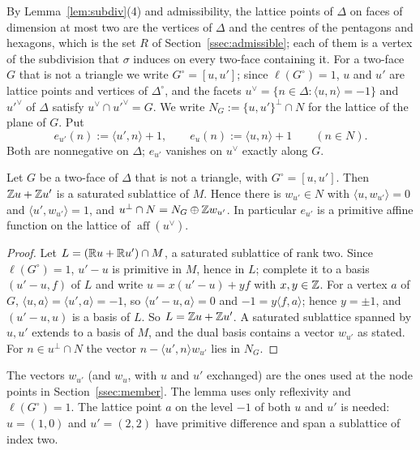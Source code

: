 By Lemma~\ref{lem:subdiv}(4) and admissibility, the lattice points of $\Delta$ on faces of dimension at most two are the
vertices of $\Delta$ and the centres of the pentagons and hexagons, which is the set $R$ of
Section~\ref{ssec:admissible}; each of them is a vertex of the subdivision that $\sigma$ induces on every two-face
containing it. For a two-face $G$ that is not a triangle we write $G^\circ=[u,u']$; since $\ell(G^\circ)=1$, $u$ and $u'$
are lattice points and vertices of $\Delta^\circ$, and the facets $u^\vee=\{n\in\Delta:\langle u,n\rangle=-1\}$ and
$u'^\vee$ of $\Delta$ satisfy $u^\vee\cap u'^\vee=G$. We write $N_G:=\{u,u'\}^\perp\cap N$ for the lattice of the plane of $G$. Put
\[
e_{u'}(n):=\langle u',n\rangle+1,\qquad e_u(n):=\langle u,n\rangle+1\qquad(n\in N).
\]
Both are nonnegative on $\Delta$; $e_{u'}$ vanishes on $u^\vee$ exactly along $G$.

\begin{lemma}\label{lem:primheight}
Let $G$ be a two-face of $\Delta$ that is not a triangle, with $G^\circ=[u,u']$. Then $\mathbb Z u+\mathbb Z u'$ is a saturated
sublattice of $M$. Hence there is $w_{u'}\in N$ with $\langle u,w_{u'}\rangle=0$ and $\langle u',w_{u'}\rangle=1$, and
$u^\perp\cap N=N_G\oplus\mathbb Z w_{u'}$. In particular $e_{u'}$ is a primitive
affine function on the lattice of $\operatorname{aff}(u^\vee)$.
\end{lemma}

\begin{proof}
Let $L=(\mathbb R u+\mathbb R u')\cap M$, a saturated sublattice of rank two. Since $\ell(G^\circ)=1$, $u'-u$ is primitive in $M$, hence
in $L$; complete it to a basis $(u'-u,f)$ of $L$ and write $u=x(u'-u)+yf$ with $x,y\in\mathbb Z$. For a vertex $a$ of $G$,
$\langle u,a\rangle=\langle u',a\rangle=-1$, so $\langle u'-u,a\rangle=0$ and $-1=y\langle f,a\rangle$; hence $y=\pm1$, and
$(u'-u,u)$ is a basis of $L$. So $L=\mathbb Z u+\mathbb Z u'$. A saturated sublattice spanned by $u,u'$ extends to a basis of $M$, and the
dual basis contains a vector $w_{u'}$ as stated. For $n\in u^\perp\cap N$ the vector $n-\langle u',n\rangle w_{u'}$ lies in $N_G$.
\end{proof}

The vectors $w_{u'}$ (and $w_u$, with $u$ and $u'$ exchanged) are the ones used at the node points in Section~\ref{ssec:member}. The lemma uses only reflexivity and $\ell(G^\circ)=1$. The lattice point $a$ on the level $-1$ of both $u$ and $u'$ is
needed: $u=(1,0)$ and $u'=(2,2)$ have primitive difference and span a sublattice of index two.

